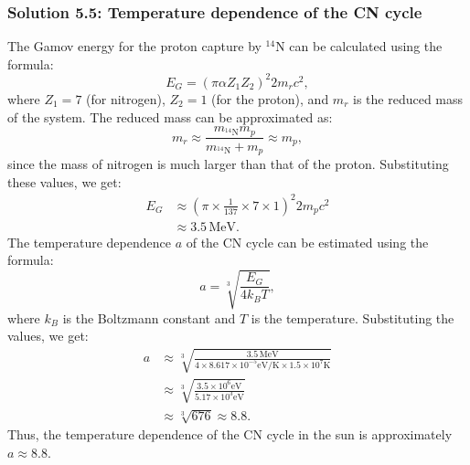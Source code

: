 \subsubsection*{Solution 5.5: Temperature dependence of the CN cycle}
The Gamov energy for the proton capture by $^{14}\text{N}$ can be calculated using the formula:
\begin{equation}
E_G = (\pi \alpha Z_1 Z_2)^2 2 m_{r}c^2,
\end{equation}
where $Z_1 = 7$ (for nitrogen), $Z_2 = 1$ (for the proton), and $m_r$ is the reduced mass of the system. The reduced mass can be approximated as:
\begin{equation}
m_r \approx \frac{m_{^{14}\text{N}} m_p}{m_{^{14}\text{N}} + m_p} \approx m_p,
\end{equation}
since the mass of nitrogen is much larger than that of the proton. Substituting these values, we get:
\begin{align*} 
E_G &\approx (\pi \times \frac{1}{137} \times 7 \times 1)^2 2 m_p c^2 \\
    &\approx 3.5\,\text{MeV}.
\end{align*}
The temperature dependence $a$ of the CN cycle can be estimated using the formula:
\begin{equation}
a = \sqrt[3]{\frac{E_G}{4 k_B T}},
\end{equation}
where $k_B$ is the Boltzmann constant and $T$ is the temperature. Substituting the values, we get:
\begin{align*}
a &\approx \sqrt[3]{\frac{3.5\,\text{MeV}}{4 \times 8.617 \times 10^{-5} \text{eV/K} \times 1.5 \times 10^7 \text{K}}} \\
&\approx \sqrt[3]{\frac{3.5 \times 10^6 \text{eV}}{5.17 \times 10^3 \text{eV}}} \\
&\approx \sqrt[3]{676} \approx 8.8.
\end{align*}
Thus, the temperature dependence of the CN cycle in the sun is approximately $a \approx 8.8$.
